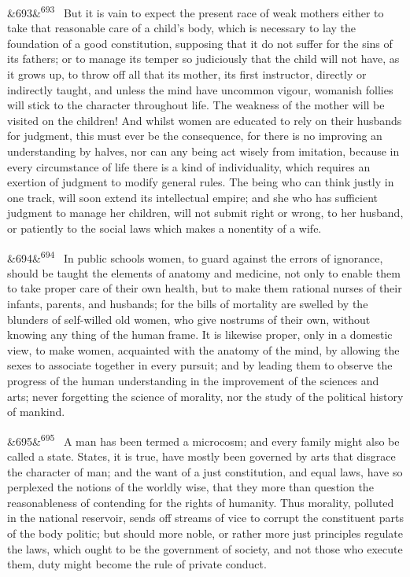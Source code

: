 \documentclass[12pt]{article}
\newcommand{\para}[1][]{\par\noindent\ifx&#1&\else\textsuperscript{\footnotesize #1}~\fi}
\begin{document}
\para[693] But it is vain to expect the present race of weak mothers either to take that reasonable care of a child's body, which is necessary to lay the foundation of a good constitution, supposing that it do not suffer for the sins of its fathers; or to manage its temper so judiciously that the child will not have, as it grows up, to throw off all that its mother, its first instructor, directly or indirectly taught, and unless the mind have uncommon vigour, womanish follies will stick to the character throughout life. The weakness of the mother will be visited on the children! And whilst women are educated to rely on their husbands for judgment, this must ever be the consequence, for there is no improving an understanding by halves, nor can any being act wisely from imitation, because in every circumstance of life there is a kind of individuality, which requires an exertion of judgment to modify general rules. The being who can think justly in one track, will soon extend its intellectual empire; and she who has sufficient judgment to manage her children, will not submit right or wrong, to her husband, or patiently to the social laws which makes a nonentity of a wife.

\para[694] In public schools women, to guard against the errors of ignorance, should be taught the elements of anatomy and medicine, not only to enable them to take proper care of their own health, but to make them rational nurses of their infants, parents, and husbands; for the bills of mortality are swelled by the blunders of self-willed old women, who give nostrums of their own, without knowing any thing of the human frame. It is likewise proper, only in a domestic view, to make women, acquainted with the anatomy of the mind, by allowing the sexes to associate together in every pursuit; and by leading them to observe the progress of the human understanding in the improvement of the sciences and arts; never forgetting the science of morality, nor the study of the political history of mankind.

\para[695] A man has been termed a microcosm; and every family might also be called a state. States, it is true, have mostly been governed by arts that disgrace the character of man; and the want of a just constitution, and equal laws, have so perplexed the notions of the worldly wise, that they more than question the reasonableness of contending for the rights of humanity. Thus morality, polluted in the national reservoir, sends off streams of vice to corrupt the constituent parts of the body politic; but should more noble, or rather more just principles regulate the laws, which ought to be the government of society, and not those who execute them, duty might become the rule of private conduct.
\end{document}
